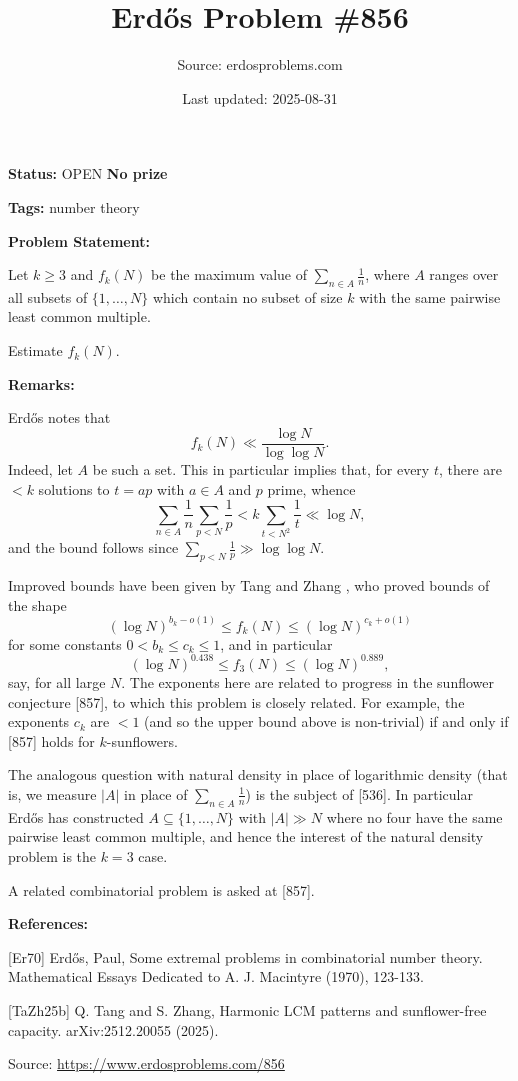 \documentclass{article}
\title{Erd\H{o}s Problem \#856}
\date{Last updated: 2025-08-31}
\author{Source: erdosproblems.com}
\begin{document}
\maketitle

\noindent\textbf{Status:} OPEN \quad \textbf{No prize}

\noindent\textbf{Tags:} number theory

\medskip
\noindent\textbf{Problem Statement:}

Let $k\geq 3$ and $f_k(N)$ be the maximum value of $\sum_{n\in A}\frac{1}{n}$, where $A$ ranges over all subsets of $\{1,\ldots,N\}$ which contain no subset of size $k$ with the same pairwise least common multiple.

Estimate $f_k(N)$.

\bigskip
\noindent\textbf{Remarks:}

Erd\H{o}s \cite{Er70} notes that\[f_k(N) \ll \frac{\log N}{\log\log N}.\]Indeed, let $A$ be such a set. This in particular implies that, for every $t$, there are $<k$ solutions to $t=ap$ with $a\in A$ and $p$ prime, whence\[\sum_{n\in A}\frac{1}{n}\sum_{p<N}\frac{1}{p}< k \sum_{t<N^2}\frac{1}{t} \ll \log N,\]and the bound follows since $\sum_{p<N}\frac{1}{p}\gg \log\log N$.

Improved bounds have been given by Tang and Zhang \cite{TaZh25b}, who proved bounds of the shape\[(\log N)^{b_k-o(1)}\leq f_k(N)\leq (\log N)^{c_k+o(1)}\]for some constants $0<b_k\leq c_k\leq 1$, and in particular\[(\log N)^{0.438}\leq f_3(N)\leq (\log N)^{0.889},\]say, for all large $N$. The exponents here are related to progress in the sunflower conjecture [857], to which this problem is closely related. For example, the exponents $c_k$ are $<1$ (and so the upper bound above is non-trivial) if and only if [857] holds for $k$-sunflowers.

The analogous question with natural density in place of logarithmic density (that is, we measure $\lvert A\rvert$ in place of $\sum_{n\in A}\frac{1}{n}$) is the subject of [536]. In particular Erd\H{o}s \cite{Er70} has constructed $A\subseteq \{1,\ldots,N\}$ with $\lvert A\rvert \gg N$ where no four have the same pairwise least common multiple, and hence the interest of the natural density problem is the $k=3$ case.

A related combinatorial problem is asked at [857].

\bigskip
\noindent\textbf{References:}

[Er70] Erd\H{o}s, Paul, Some extremal problems in combinatorial number theory. Mathematical Essays Dedicated to A. J. Macintyre (1970), 123-133.
 
 [TaZh25b] Q. Tang and S. Zhang, Harmonic LCM patterns and sunflower-free capacity. arXiv:2512.20055 (2025).

\bigskip
\noindent\small{Source: \url{https://www.erdosproblems.com/856}}
\end{document}
